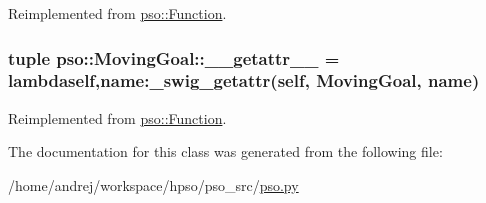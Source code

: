 Reimplemented from \hyperlink{classpso_1_1Function_5bddc07dbaab0ee579488bdcc8103a71}{pso::Function}.\hypertarget{classpso_1_1MovingGoal_6346e192c789f63d5942d57d9ce6f955}{
\subsubsection{\setlength{\rightskip}{0pt plus 5cm}tuple {\bf pso::MovingGoal::\_\-\_\-getattr\_\-\_\-} = lambdaself,name:\_\-swig\_\-getattr(self, {\bf MovingGoal}, name)}}
\label{classpso_1_1MovingGoal_6346e192c789f63d5942d57d9ce6f955}




Reimplemented from \hyperlink{classpso_1_1Function_affeed856b337656e88895fa35321496}{pso::Function}.

The documentation for this class was generated from the following file:\begin{CompactItemize}
\item 
/home/andrej/workspace/hpso/pso\_\-src/\hyperlink{pso_8py}{pso.py}\end{CompactItemize}
